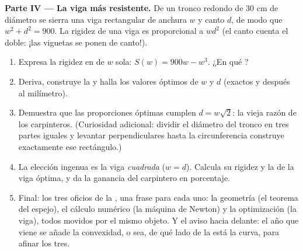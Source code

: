 \begin{problem}
\medskip
\noindent\textbf{Parte IV --- La viga más resistente.}
De un tronco redondo de $30$ cm de diámetro se sierra una viga rectangular
de anchura $w$ y canto $d$, de modo que $w^2 + d^2 = 900$. La rigidez de
una viga es proporcional a $w d^2$ (el canto cuenta el doble: ¡las viguetas
se ponen de canto!).
\begin{enumerate}[resume]
  \item Expresa la rigidez en  de $w$ sola: $S(w) = 900w - w^3$.
        ¿En qué ?
  \item Deriva, construye la  y halla los valores
        óptimos de $w$ y $d$ (exactos y después al milímetro).
  \item Demuestra que las proporciones óptimas cumplen $d = w\sqrt2$: la
        vieja razón de los carpinteros. (Curiosidad adicional: dividir el
        diámetro del tronco en tres partes iguales y levantar
        perpendiculares hasta la circunferencia construye exactamente ese
        rectángulo.)
  \item La elección ingenua es la viga \emph{cuadrada} ($w = d$). Calcula
        su rigidez y la de la viga óptima, y da la ganancia del carpintero
        en porcentaje.
  \item Final: los tres oficios de la , una frase para cada uno:
        la geometría (el teorema del espejo), el cálculo numérico (la
        máquina de Newton) y la optimización (la viga), todos movidos por
        el mismo objeto. Y el aviso hacia delante: el año que viene se
        añade la convexidad, o sea, de qué lado de la  está la
        curva, para afinar los tres.
\end{enumerate}
\end{problem}

